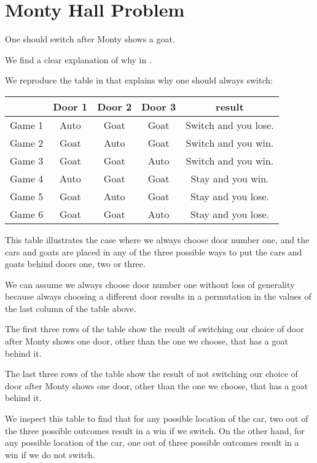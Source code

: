 \documentclass[a4paper,11pt]{article}
\begin{document}
\section{Monty Hall Problem}

One should switch after Monty shows a goat.

We find a clear explanation of why in \cite{paradeMag}.

We reproduce the table in \cite{paradeMag} that explains why one should
always switch:

\begin{center}
  \begin{tabular}{ | c | c | c | c | c |}
    \hline
     & Door 1 & Door 2 & Door 3 & result \\ \hline
    Game 1 & Auto & Goat & Goat & Switch and you lose. \\ \hline
    Game 2 & Goat & Auto & Goat & Switch and you win. \\ \hline
    Game 3 & Goat & Goat & Auto & Switch and you win. \\ \hline
    Game 4 & Auto & Goat & Goat & Stay and you win. \\ \hline
    Game 5 & Goat & Auto & Goat & Stay and you lose. \\ \hline
    Game 6 & Goat & Goat & Auto & Stay and you lose.\\ \hline
  \end{tabular}
\end{center}

This table illustrates the case where we always choose door number one,
and the cars and goats are placed in any of the three possible ways
to put the cars and goats behind doors one, two or three. 

We can assume we always choose door number one without loss of 
generality because always choosing a different door results
in a permutation in the values of the last column of the table above.

The first three rows of the table show the result of switching our 
choice of door after Monty shows one door, other than the one we choose,
that has a goat behind it.

The last three rows of the table show the result of not switching our 
choice of door after Monty shows one door, other than the one we choose,
that has a goat behind it.

We inspect this table to find that for any possible location of the
car, two out of the three possible outcomes result in a win if we
switch.  On the other hand, for any possible location of the car,
one out of three possible outcomes result in a win if we do not switch.
\end{document}
